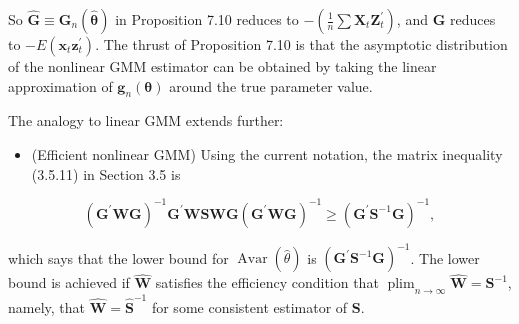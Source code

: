 \documentclass[10pt]{article}
\begin{document}
So $\widehat{\mathbf{G}} \equiv \mathbf{G}_{n}(\hat{\boldsymbol{\theta}})$ in Proposition 7.10 reduces to $-\left(\frac{1}{n} \sum \mathbf{X}_{t} \mathbf{Z}_{t}^{\prime}\right)$, and $\mathbf{G}$ reduces to $-E\left(\mathbf{x}_{t} \mathbf{z}_{t}^{\prime}\right)$. The thrust of Proposition 7.10 is that the asymptotic distribution of the nonlinear GMM estimator can be obtained by taking the linear approximation of $\mathbf{g}_{n}(\boldsymbol{\theta})$ around the true parameter value.

The analogy to linear GMM extends further:

\begin{itemize}
  \item (Efficient nonlinear GMM) Using the current notation, the matrix inequality (3.5.11) in Section 3.5 is
\end{itemize}


\begin{equation*}
\left(\mathbf{G}^{\prime} \mathbf{W G}\right)^{-1} \mathbf{G}^{\prime} \mathbf{W S} \mathbf{W G}\left(\mathbf{G}^{\prime} \mathbf{W G}\right)^{-1} \geq\left(\mathbf{G}^{\prime} \mathbf{S}^{-1} \mathbf{G}\right)^{-1}, \tag{7.3.36}
\end{equation*}


which says that the lower bound for $\operatorname{Avar}(\hat{\theta})$ is $\left(\mathbf{G}^{\prime} \mathbf{S}^{-1} \mathbf{G}\right)^{-1}$. The lower bound is achieved if $\widehat{\mathbf{W}}$ satisfies the efficiency condition that $\operatorname{plim}_{n \rightarrow \infty} \widehat{\mathbf{W}}=\mathbf{S}^{-1}$, namely, that $\widehat{\mathbf{W}}=\widehat{\mathbf{S}}^{-1}$ for some consistent estimator of $\mathbf{S}$.
\end{document}
